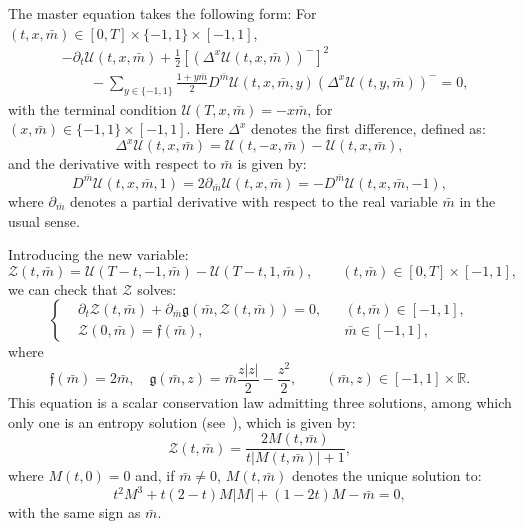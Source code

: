 \documentclass{amsproc}
\theoremstyle{definition}
\theoremstyle{remark}
\numberwithin{equation}{section}
\newcommand{\RR}{{\mathbb R}}
\newcommand{\cU}{{\mathcal U}}
\newcommand{\cZ}{{\mathcal Z}}
\begin{document}
The master equation takes the following form:  For $(t,x,\bar{m}) \in [0,T] \times \{-1,1\} \times [-1,1]$,
\begin{align*}
	&-\partial_t \cU(t,x,\bar{m})
	+
	\frac{1}{2} \left[ (\Delta^x \cU(t,x,\bar{m}))^- \right]^2 
	\\
	&\qquad - \sum_{y \in\{-1,1\}} \frac{1+ y \bar{m}}{2} D^{\bar{m}} \cU(t,x,\bar{m}, y) (\Delta^x \cU(t, y, \bar{m}))^- 
	= 0,
\end{align*}
with the terminal condition $\cU(T,x,\bar{m}) = - x \bar{m}$, for $(x,\bar{m}) \in \{-1,1\} \times [-1,1]$. Here $\Delta^x$ denotes the first difference, defined as:
$$
	\Delta^x \cU(t,x,\bar{m}) = \cU(t,-x,\bar{m}) - \cU(t,x,\bar{m}),
$$
and the derivative with respect to $\bar{m}$ is given by:
$$
	D^{\bar{m}} \cU(t,x,\bar{m},1) = 2 \partial_{\bar{m}} \cU(t,x,\bar{m}) = -D^{\bar{m}} \cU(t,x,\bar{m},-1),
$$ 
where $\partial_{\bar{m}}$ denotes a partial derivative with respect to the real variable $\bar{m}$ in the usual sense.

Introducing the new variable:
\begin{equation}
\label{AMS-num-eq:entropy-U-to-Z}
	\cZ(t,\bar{m}) = \cU(T-t,-1,\bar{m}) - \cU(T-t,1,\bar{m}), \qquad (t, \bar m) \in [0,T] \times [-1,1],
\end{equation}
we can check that $\cZ$ solves: 
\begin{equation*}
\left\{
\begin{split}
	& \partial_t \cZ(t,\bar{m}) + \partial_{\bar{m}} \mathfrak{g}(\bar{m}, \cZ(t,\bar{m})) = 0,  &&(t,\bar{m}) \in [-1,1],
	\\
	& \cZ(0,\bar{m}) = \mathfrak{f}(\bar{m}), &&\bar{m} \in [-1,1],
\end{split}
\right.
\end{equation*}
where
$$
	\mathfrak{f}(\bar{m}) = 2 \bar{m},
	\quad \mathfrak{g}(\bar{m}, z) = \bar{m} \frac{z |z|}{2} - \frac{z^2}{2},
	\qquad (\bar m, z) \in [-1,1] \times \RR.
$$
This equation is a scalar conservation law admitting three solutions, among which only one is an entropy solution (see~\cite[Proposition 3]{MR3981375}), which is given by:
\begin{equation}
\label{AMS-num-eq:entropy-Z-expli}
	\cZ(t, \bar{m}) = \frac{2 M(t,\bar{m})}{t |M(t, \bar{m})| + 1},
\end{equation}
where $M(t, 0) = 0$ and,  if $\bar{m} \neq 0$, $M(t, \bar{m})$ denotes the unique solution to: 
$$
	t^2M^3 + t(2-t)M |M| + (1-2t)M - \bar{m} = 0, 
$$
with the same sign as $\bar{m}$.
\end{document}
